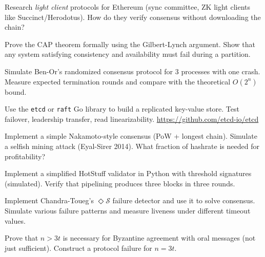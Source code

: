 \begin{exercise}[Intermediate]
Research \emph{light client} protocols for Ethereum (sync committee, ZK light clients like Succinct/Herodotus). How do they verify consensus without downloading the chain?
\end{exercise}

\begin{exercise}[Intermediate]
Prove the CAP theorem formally using the Gilbert-Lynch argument. Show that any system satisfying consistency and availability must fail during a partition.
\end{exercise}

\begin{exercise}[Intermediate]
Simulate Ben-Or's randomized consensus protocol for 3 processes with one crash. Measure expected termination rounds and compare with the theoretical $O(2^n)$ bound.
\end{exercise}

\begin{exercise}[Computational]
Use the \texttt{etcd} or \texttt{raft} Go library to build a replicated key-value store. Test failover, leadership transfer, read linearizability. \url{https://github.com/etcd-io/etcd}
\end{exercise}

\begin{exercise}[Computational]
Implement a simple Nakamoto-style consensus (PoW + longest chain). Simulate a selfish mining attack (Eyal-Sirer 2014). What fraction of hashrate is needed for profitability?
\end{exercise}

\begin{exercise}[Computational]
Implement a simplified HotStuff validator in Python with threshold signatures (simulated). Verify that pipelining produces three blocks in three rounds.
\end{exercise}

\begin{exercise}[Computational]
Implement Chandra-Toueg's $\Diamond \mathcal{S}$ failure detector and use it to solve consensus. Simulate various failure patterns and measure liveness under different timeout values.
\end{exercise}

\begin{exercise}[Challenge]
Prove that $n > 3t$ is necessary for Byzantine agreement with oral messages (not just sufficient). Construct a protocol failure for $n = 3t$.
\end{exercise}

